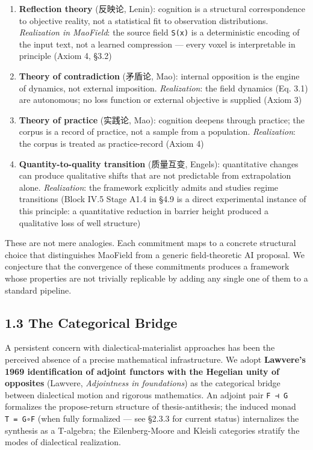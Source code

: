 \documentclass[
]{article}
\providecommand{\tightlist}{%
  \setlength{\itemsep}{0pt}\setlength{\parskip}{0pt}}
\begin{document}
\begin{enumerate}
\def\labelenumi{\arabic{enumi}.}
\tightlist
\item
  \textbf{Reflection theory} (反映论, Lenin): cognition is a structural
  correspondence to objective reality, not a statistical fit to
  observation distributions. \emph{Realization in MaoField}: the source
  field \texttt{S(x)} is a deterministic encoding of the input text, not
  a learned compression --- every voxel is interpretable in principle
  (Axiom 4, §3.2)
\item
  \textbf{Theory of contradiction} (矛盾论, Mao): internal opposition is
  the engine of dynamics, not external imposition. \emph{Realization}:
  the field dynamics (Eq. 3.1) are autonomous; no loss function or
  external objective is supplied (Axiom 3)
\item
  \textbf{Theory of practice} (实践论, Mao): cognition deepens through
  practice; the corpus is a record of practice, not a sample from a
  population. \emph{Realization}: the corpus is treated as
  practice-record (Axiom 4)
\item
  \textbf{Quantity-to-quality transition} (质量互变, Engels):
  quantitative changes can produce qualitative shifts that are not
  predictable from extrapolation alone. \emph{Realization}: the
  framework explicitly admits and studies regime transitions (Block IV.5
  Stage A1.4 in §4.9 is a direct experimental instance of this
  principle: a quantitative reduction in barrier height produced a
  qualitative loss of well structure)
\end{enumerate}

These are not mere analogies. Each commitment maps to a concrete
structural choice that distinguishes MaoField from a generic
field-theoretic AI proposal. We conjecture that the convergence of these
commitments produces a framework whose properties are not trivially
replicable by adding any single one of them to a standard pipeline.

\hypertarget{the-categorical-bridge}{%
\subsection{1.3 The Categorical Bridge}\label{the-categorical-bridge}}

A persistent concern with dialectical-materialist approaches has been
the perceived absence of a precise mathematical infrastructure. We adopt
\textbf{Lawvere's 1969 identification of adjoint functors with the
Hegelian unity of opposites} (Lawvere, \emph{Adjointness in
foundations}) as the categorical bridge between dialectical motion and
rigorous mathematics. An adjoint pair \texttt{F\ ⊣\ G} formalizes the
propose-return structure of thesis-antithesis; the induced monad
\texttt{T\ =\ G∘F} (when fully formalized --- see §2.3.3 for current
status) internalizes the synthesis as a T-algebra; the Eilenberg-Moore
and Kleisli categories stratify the modes of dialectical realization.
\end{document}
